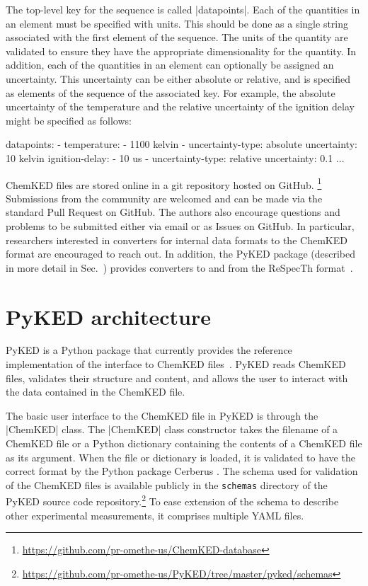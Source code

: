 \documentclass[12pt]{ijck}
\newcommand\ck{ChemKED}
\newcommand\pk{PyKED}
\begin{document}
The top-level key for the sequence is called \yabox|datapoints|. Each of the
quantities in an element must be specified with units. This should be done as a
single string associated with the first element of the sequence. The units of
the quantity are validated to ensure they have the appropriate dimensionality
for the quantity. In addition, each of the quantities in an element can
optionally be assigned an uncertainty. This uncertainty can be either absolute
or relative, and is specified as elements of the sequence of the associated key.
For example, the absolute uncertainty of the temperature and the relative
uncertainty of the ignition delay might be specified as follows:

\begin{yamlbox}
datapoints:
  - temperature:
      - 1100 kelvin
      - uncertainty-type: absolute
        uncertainty: 10 kelvin
    ignition-delay:
      - 10 us
      - uncertainty-type: relative
        uncertainty: 0.1
    ...
\end{yamlbox}

\ck{} files are stored online in a git repository hosted on GitHub.
\footnote{\url{https://github.com/pr-omethe-us/ChemKED-database}}
Submissions from the community are welcomed and can be made via the standard Pull Request
on GitHub. The authors also encourage questions and problems to be submitted either via
email or as Issues on GitHub. In particular, researchers interested in converters for
internal data formats to the \ck{} format are encouraged to reach out. In addition,
the \pk{} package (described in more detail in Sec.~\label{sec:pyked-architecture})
provides converters to and from the ReSpecTh format~\autocite{Varga2015b}.

\section{PyKED architecture}\label{sec:pyked-architecture}
%
\pk{} is a Python package that currently provides the reference implementation
of the interface to \ck{} files~\autocite{PyKED}. \pk{} reads \ck{} files, validates
their structure and content, and allows the user to interact with the data contained
in the \ck{} file.

The basic user interface to the \ck{} file in \pk{} is through the
\pybox|ChemKED| class. The \pybox|ChemKED| class constructor takes the filename
of a \ck{} file or a Python dictionary containing the contents of a \ck{} file
as its argument. When the file or dictionary is loaded, it is validated to have
the correct format by the Python package Cerberus \autocite{cerberus}. The
schema used for validation of the \ck{} files is available publicly in the
\texttt{schemas} directory of the PyKED source code
repository.\footnote{\url{https://github.com/pr-omethe-us/PyKED/tree/master/pyked/schemas}}
To ease extension of the schema to describe other experimental measurements, it
comprises multiple YAML files.
\end{document}
